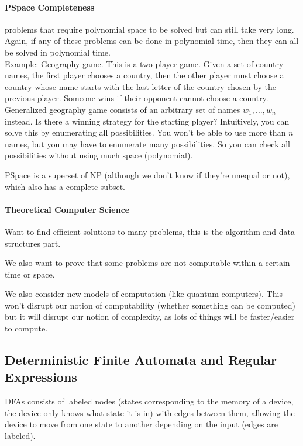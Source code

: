 \documentclass[12 pt]{article}
\begin{document}
\paragraph{PSpace Completeness}\label{psp1} problems that require polynomial space to be solved but can
still take very long. Again, if any of these problems can be done in
polynomial time, then they can all be solved in polynomial time.
\\ Example: Geography game. This is a two player game. Given a set of
country names, the first player chooses a country, then the other
player must choose a country whose name starts with the last letter of
the country chosen by the previous player. Someone wins if their
opponent cannot choose a country.
\\ Generalized geography game consists of an arbitrary set of names
$w_1, \ldots, w_n$ instead. Is there a winning strategy for the
starting player? Intuitively, you can solve this by enumerating all
possibilities. You won't be able to use more than $n$ names, but you
may have to enumerate many possibilities. So you can check all
possibilities without using much space (polynomial).

PSpace is a superset of NP (although we don't know if they're unequal
or not), which also has a complete subset.

\paragraph{Theoretical Computer Science}
Want to find efficient solutions to many problems, this is the
algorithm and data structures part.

We also want to prove that some problems are not computable within a
certain time or space.

We also consider new models of computation (like quantum
computers). This won't disrupt our notion of computability (whether
something can be computed) but it will disrupt our notion of
complexity, as lots of things will be faster/easier to compute.

\subsection{Deterministic Finite Automata and Regular Expressions}
DFAs consists of labeled nodes (states corresponding to the memory of
a device, the device only knows what state it is in) with edges
between them, allowing the device to move from one state to another
depending on the input (edges are labeled).
\end{document}
